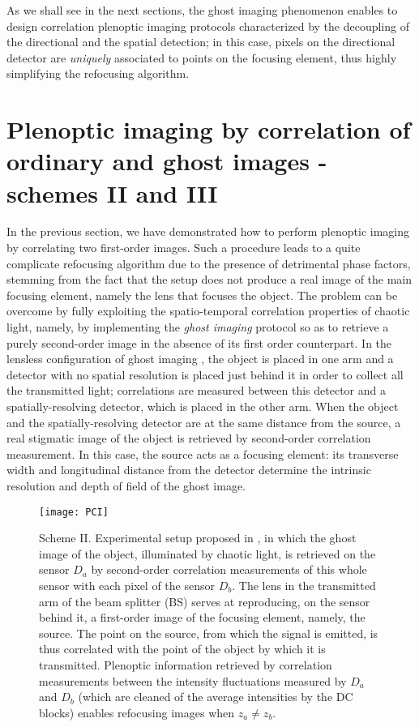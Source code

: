 \documentclass[aps,pra,amssymb,twocolumn,amsmath,superscriptaddress,showpacs,10pt]{revtex4-1}
\begin{document}
As we shall see in the next sections, the ghost imaging phenomenon enables to design correlation plenoptic imaging protocols characterized by the decoupling of the directional and the spatial detection; in this case, pixels on the directional detector are \textit{uniquely} associated to points on the focusing element, thus highly simplifying the refocusing algorithm. 

\section{Plenoptic imaging by correlation of ordinary and ghost images - schemes II and III}

In the previous section, we have demonstrated how to perform plenoptic imaging by correlating two first-order images. Such a procedure leads to a quite complicate refocusing algorithm due to the presence of detrimental phase factors, stemming from the fact that the setup does not produce a real image of the main focusing element, namely the lens that focuses the object.  The problem can be overcome by fully exploiting the spatio-temporal correlation properties of chaotic light, namely, by implementing the \textit{ghost imaging} protocol \cite{pittman,gatti,laserphys,valencia,scarcelliPRL} so as to retrieve a purely second-order image in the absence of its first order counterpart. In the lensless configuration of ghost imaging \cite{scarcelliPRL}, the object is placed in one arm and a detector with no spatial resolution is placed just behind it in order to collect all the transmitted light; correlations are measured between this detector and a spatially-resolving detector, which is placed in the other arm. When the object and the spatially-resolving detector are at the same distance from the source, a real stigmatic image of the object is retrieved by second-order correlation measurement. In this case, the source acts as a focusing element: its transverse width and longitudinal distance from the detector determine the intrinsic resolution and depth of field of the ghost image.


\begin{figure}
\centering
\texttt{[image: PCI]}
\caption{\small Scheme II. Experimental setup proposed in \cite{cpi_prl}, in which the ghost image of the object, illuminated by chaotic light, is retrieved on the sensor $D_a$ by second-order correlation measurements of this whole sensor with each pixel of the sensor $D_b$. The lens in the transmitted arm of the beam splitter (BS) serves at reproducing, on the sensor behind it, a first-order image of the focusing element, namely, the source. The point on the source, from which the signal is emitted, is thus correlated with the point of the object by which it is transmitted. Plenoptic information retrieved by correlation measurements between the intensity fluctuations measured by $D_a$ and $D_b$ (which are cleaned of the average intensities by the DC blocks) enables refocusing images when $z_a\neq z_b$.  }\label{fig.PCI}
\end{figure}
\end{document}

